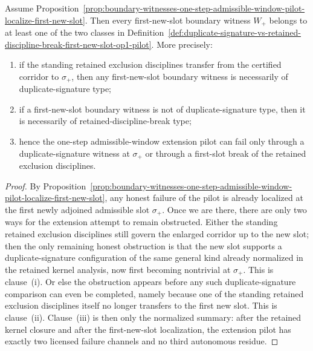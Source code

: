\begin{proposition}
\label{prop:first-new-slot-boundary-witnesses-split-duplicate-signature-vs-retained-discipline-break}
Assume Proposition~\ref{prop:boundary-witnesses-one-step-admissible-window-pilot-localize-first-new-slot}. Then every first-new-slot boundary witness $W_{+}$ belongs to at least one of the two classes in Definition~\ref{def:duplicate-signature-vs-retained-discipline-break-first-new-slot-op1-pilot}. More precisely:
\begin{enumerate}[leftmargin=2em,label=(\roman*)]
  \item if the standing retained exclusion disciplines transfer from the certified corridor to $\sigma_{+}$, then any first-new-slot boundary witness is necessarily of duplicate-signature type;
  \item if a first-new-slot boundary witness is not of duplicate-signature type, then it is necessarily of retained-discipline-break type;
  \item hence the one-step admissible-window extension pilot can fail only through a duplicate-signature witness at $\sigma_{+}$ or through a first-slot break of the retained exclusion disciplines.
\end{enumerate}
\end{proposition}

\begin{proof}
By Proposition~\ref{prop:boundary-witnesses-one-step-admissible-window-pilot-localize-first-new-slot}, any honest failure of the pilot is already localized at the first newly adjoined admissible slot $\sigma_{+}$. Once we are there, there are only two ways for the extension attempt to remain obstructed. Either the standing retained exclusion disciplines still govern the enlarged corridor up to the new slot; then the only remaining honest obstruction is that the new slot supports a duplicate-signature configuration of the same general kind already normalized in the retained kernel analysis, now first becoming nontrivial at $\sigma_{+}$. This is clause~(i). Or else the obstruction appears before any such duplicate-signature comparison can even be completed, namely because one of the standing retained exclusion disciplines itself no longer transfers to the first new slot. This is clause~(ii). Clause~(iii) is then only the normalized summary: after the retained kernel closure and after the first-new-slot localization, the extension pilot has exactly two licensed failure channels and no third autonomous residue.
\end{proof}

